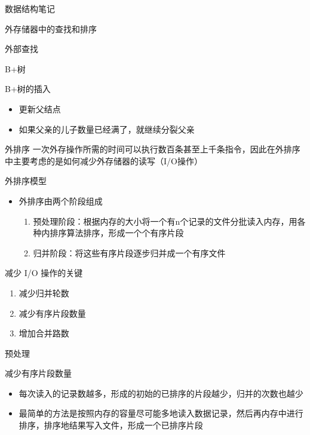 \documentclass[
  ignorenonframetext,
]{beamer}
\providecommand{\tightlist}{%
  \setlength{\itemsep}{0pt}\setlength{\parskip}{0pt}}
\begin{document}
\begin{frame}[fragile]{数据结构笔记}
\begin{block}{外存储器中的查找和排序}
\begin{block}{外部查找}
\begin{block}{B+树}
\begin{block}{B+树的插入}
\begin{itemize}
  \begin{itemize}
  \tightlist
  \item
    更新父结点
  \item
    如果父亲的儿子数量已经满了，就继续分裂父亲
  \end{itemize}
\end{itemize}
\end{block}
\end{block}
\end{block}

\begin{block}{外排序}
\protect{}\label{ux5916ux6392ux5e8f}
一次外存操作所需的时间可以执行数百条甚至上千条指令，因此在外排序中主要考虑的是如何减少外存储器的读写（I/O操作）

\begin{block}{外排序模型}
\protect{}\label{ux5916ux6392ux5e8fux6a21ux578b}
\begin{itemize}
\tightlist
\item
  外排序由两个阶段组成

  \begin{enumerate}
  \tightlist
  \item
    预处理阶段：根据内存的大小将一个有n个记录的文件分批读入内存，用各种内排序算法排序，形成一个个有序片段
  \item
    归并阶段：将这些有序片段逐步归并成一个有序文件
  \end{enumerate}
\end{itemize}

减少 I/O 操作的关键

\begin{enumerate}
\tightlist
\item
  减少归并轮数
\item
  减少有序片段数量
\item
  增加合并路数
\end{enumerate}
\end{block}

\begin{block}{预处理}
\protect{}\label{ux9884ux5904ux7406}
\begin{block}{减少有序片段数量}
\protect{}\label{ux51cfux5c11ux6709ux5e8fux7247ux6bb5ux6570ux91cf}
\begin{itemize}
\tightlist
\item
  每次读入的记录数越多，形成的初始的已排序的片段越少，归并的次数也越少
\item
  最简单的方法是按照内存的容量尽可能多地读入数据记录，然后再内存中进行排序，排序地结果写入文件，形成一个已排序片段
\end{itemize}
\end{block}


\end{block}
\end{block}
\end{block}
\end{frame}
\end{document}

